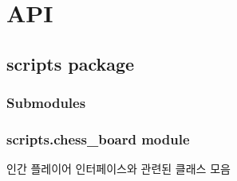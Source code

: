 \documentclass[letterpaper,10pt,english]{sphinxmanual}
\begin{document}
\chapter{API}
\label{\detokenize{index:api}}

\section{scripts package}
\label{\detokenize{scripts::doc}}\label{\detokenize{scripts:scripts-package}}

\subsection{Submodules}
\label{\detokenize{scripts:submodules}}

\subsection{scripts.chess\_board module}
\label{\detokenize{scripts:module-scripts.chess_board}}\label{\detokenize{scripts:scripts-chess-board-module}}
인간 플레이어 인터페이스와 관련된 클래스 모음
\end{document}
